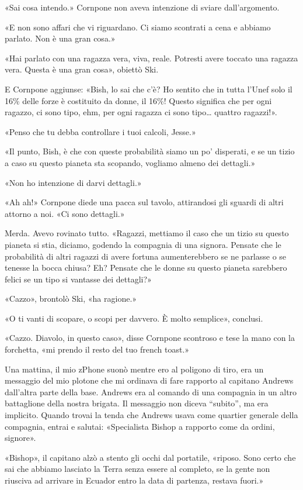 «Sai cosa intendo.» Cornpone non aveva intenzione di sviare
dall'argomento.

«E non sono affari che vi riguardano. Ci siamo scontrati a cena e
abbiamo parlato. Non è una gran cosa.»

«Hai parlato con una ragazza vera, viva, reale. Potresti avere toccato
una ragazza vera. Questa è una gran cosa», obiettò Ski.

E Cornpone aggiunse: «Bish, lo sai che c'è? Ho sentito che in tutta
l'Unef solo il 16\% delle forze è costituito da donne, il 16\%! Questo
significa che per ogni ragazzo, ci sono tipo, ehm, per ogni ragazza ci
sono tipo\ldots{} quattro ragazzi!».

«Penso che tu debba controllare i tuoi calcoli, Jesse.»

«Il punto, Bish, è che con queste probabilità siamo un po' disperati, e
se un tizio a caso su questo pianeta sta scopando, vogliamo almeno dei
dettagli.»

«Non ho intenzione di darvi dettagli.»

«Ah ah!» Cornpone diede una pacca sul tavolo, attirandosi gli sguardi di
altri attorno a noi. «Ci sono dettagli.»

Merda. Avevo rovinato tutto. «Ragazzi, mettiamo il caso che un tizio su
questo pianeta si stia, diciamo, godendo la compagnia di una signora.
Pensate che le probabilità di altri ragazzi di avere fortuna
aumenterebbero se ne parlasse o se tenesse la bocca chiusa? Eh? Pensate
che le donne su questo pianeta sarebbero felici se un tipo si vantasse
dei dettagli?»

«Cazzo», brontolò Ski, «ha ragione.»

«O ti vanti di scopare, o scopi per davvero. È molto semplice»,
conclusi.

«Cazzo. Diavolo, in questo caso», disse Cornpone scontroso e tese la
mano con la forchetta, «mi prendo il resto del tuo french toast.»

\hfill\break

Una mattina, il mio zPhone suonò mentre ero al poligono di tiro, era un
messaggio del mio plotone che mi ordinava di fare rapporto al capitano
Andrews dall'altra parte della base. Andrews era al comando di una
compagnia in un altro battaglione della nostra brigata. Il messaggio non
diceva ``subito'', ma era implicito. Quando trovai la tenda che Andrews
usava come quartier generale della compagnia, entrai e salutai:
«Specialista Bishop a rapporto come da ordini, signore».

«Bishop», il capitano alzò a stento gli occhi dal portatile, «riposo.
Sono certo che sai che abbiamo lasciato la Terra senza essere al
completo, se la gente non riusciva ad arrivare in Ecuador entro la data
di partenza, restava fuori.»

